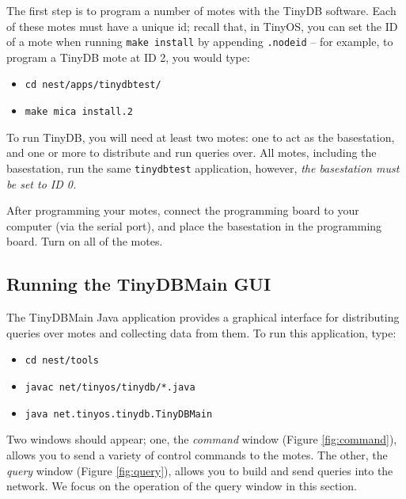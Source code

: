 \documentclass[11pt]{article}
\begin{document}
The first step is to program a number
of motes with the TinyDB software.  Each of these motes must have a unique id;  recall that,
in TinyOS, you can set the ID of a mote when running {\tt make install} by appending {\tt .nodeid}
-- for example, to program a TinyDB mote at ID 2, you would type:

\begin{itemize}
\item {\tt cd nest/apps/tinydbtest/}
\item {\tt make mica install.2}
\end{itemize}

\noindent To run TinyDB, you will need at least two motes:  one to act as the basestation, and one
or more to distribute and run queries over.  All motes, including the basestation, run the same
{\tt tinydbtest} application, however, {\it the basestation must be set to ID 0.}  

After programming your motes, connect the programming board to your computer (via the serial
port), and place the basestation in the programming board.  Turn on all of the motes.

\subsection{Running the TinyDBMain GUI}

The TinyDBMain Java application provides a graphical interface for distributing queries 
over motes and collecting data from them.  To run this application, type:

\begin{itemize}
\item {\tt cd nest/tools}
\item {\tt javac net/tinyos/tinydb/*.java}
\item {\tt java net.tinyos.tinydb.TinyDBMain}
\end{itemize}

Two windows should appear;  one, the {\it command} window (Figure \ref{fig:command}),
 allows you to send a variety of control commands to the motes.  The other, the {\it query} window
(Figure \ref{fig:query}),
allows you to build and send queries into the network.  We focus on the operation of the
query window in this section.
\end{document}
